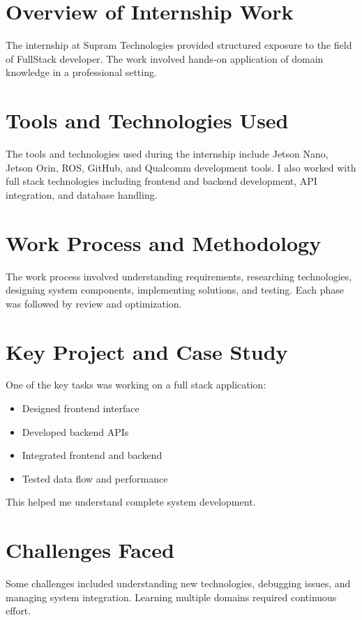 \documentclass[12pt,a4paper]{report}
\begin{document}
\section{Overview of Internship Work}
The internship at Supram Technologies provided structured exposure to the field of FullStack developer. The work involved hands-on application of domain knowledge in a professional setting.

\section{Tools and Technologies Used}
The tools and technologies used during the internship include Jetson Nano, Jetson Orin, ROS, GitHub, and Qualcomm development tools. I also worked with full stack technologies including frontend and backend development, API integration, and database handling.

\section{Work Process and Methodology}
The work process involved understanding requirements, researching technologies, designing system components, implementing solutions, and testing. Each phase was followed by review and optimization.

\section{Key Project and Case Study}
One of the key tasks was working on a full stack application:

\begin{itemize}[leftmargin=1.5em]
    \item Designed frontend interface
    \item Developed backend APIs
    \item Integrated frontend and backend
    \item Tested data flow and performance
\end{itemize}

This helped me understand complete system development.



\section{Challenges Faced}
Some challenges included understanding new technologies, debugging issues, and managing system integration. Learning multiple domains required continuous effort.
\end{document}
